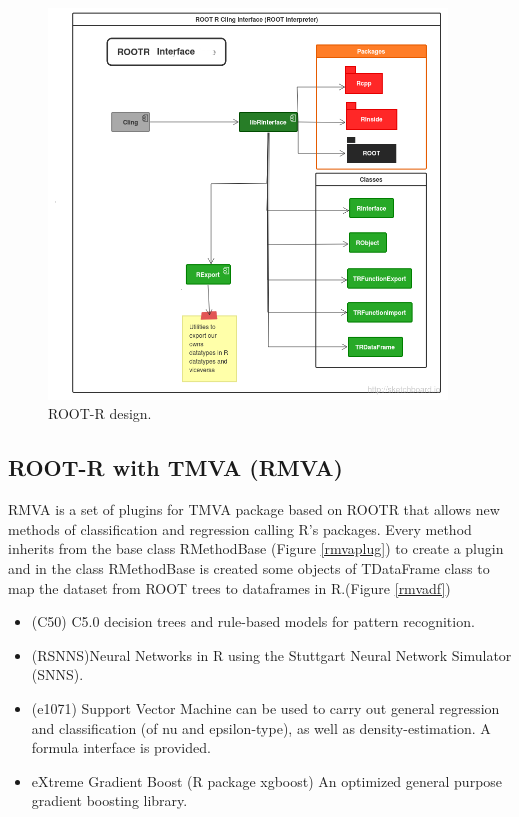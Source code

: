\documentclass[a4paper]{jpconf}
\begin{document}
\begin{figure}[h]
\centering
\includegraphics[width=25pc]{img/rootr.png}\caption{\label{rootr:label} ROOT-R design.}
\end{figure}


\subsection{ROOT-R with TMVA (RMVA)}\label{RMVA}
RMVA is a set of plugins for TMVA package based on ROOTR
that allows new methods of classification and regression calling
R's packages.
Every method inherits from the base class RMethodBase (Figure \ref{rmvaplug})
to create a plugin and in the class RMethodBase is created some objects of TDataFrame class to map
the dataset from ROOT trees to dataframes in R.(Figure \ref{rmvadf}) 
\begin{itemize}  
\item (C50) C5.0 decision trees and rule-based models for pattern
recognition\cite{c50}.
\item (RSNNS)Neural Networks in R using the Stuttgart Neural
Network Simulator (SNNS)\cite{rsnns}.
\item (e1071) Support Vector Machine can be used to carry out
general regression and classification (of nu and epsilon-type),
as well as density-estimation. A formula interface is provided\cite{e1071}.
\item eXtreme Gradient Boost (R package xgboost) An optimized
general purpose gradient boosting library\cite{chen2015xgboost}.
\end{itemize}
\end{document}
